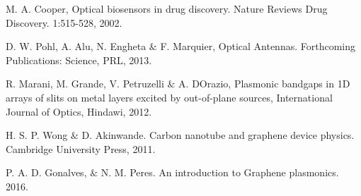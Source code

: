 
\begin{thebibliography}{00}
 M. A. Cooper, Optical biosensors in drug discovery. Nature Reviews Drug Discovery. 1:515-528, 2002.

 D. W. Pohl, A. Alu, N. Engheta $\&$ F. Marquier, Optical Antennas. Forthcoming Publications: Science, PRL, 2013.

 R. Marani, M. Grande, V. Petruzelli $\&$ A. DOrazio, Plasmonic bandgaps in 1D arrays of slits on metal layers excited by out-of-plane sources, International Journal of Optics, Hindawi, 2012.

 H. S. P. Wong $\&$ D. Akinwande. Carbon nanotube and graphene device physics. Cambridge University Press, 2011.

 P. A. D. Gonalves, $\&$ N. M. Peres. An introduction to Graphene plasmonics. 2016.

\end{thebibliography}